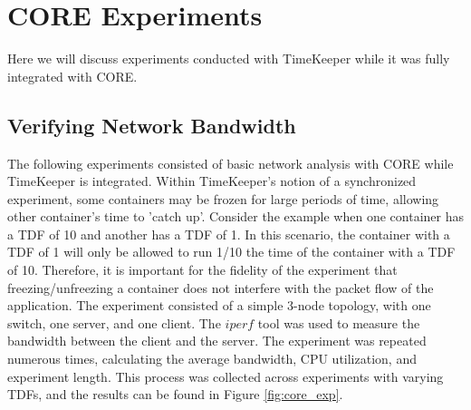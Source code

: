 \section{CORE Experiments}
\label {sec:core_experiments}
Here we will discuss experiments conducted with TimeKeeper while it was fully integrated with CORE. 
\subsection{Verifying Network Bandwidth}
The following experiments consisted of basic network analysis with CORE while TimeKeeper is integrated. Within TimeKeeper's notion of a synchronized experiment, some containers may be frozen for large periods of time, allowing other container's time to 'catch up'. Consider the example when one container has a TDF of 10 and another has a TDF of 1. In this scenario, the container with a TDF of 1 will only be allowed to run 1/10 the time of the container with a TDF of 10. Therefore, it is important for the fidelity of the experiment that freezing/unfreezing a container does not interfere with the packet flow of the application. The experiment consisted of a simple 3-node topology, with one switch, one server, and one client. The $iperf$ tool was used to measure the bandwidth between the client and the server. The experiment was repeated numerous times, calculating the average bandwidth, CPU utilization, and experiment length. This process was collected across experiments with varying TDFs, and the results can be found in Figure \ref{fig:core_exp}.
